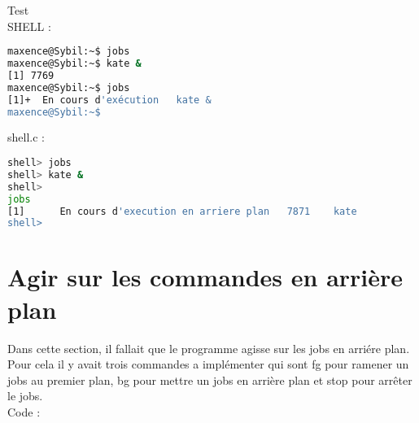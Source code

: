 \documentclass{report}
\begin{document}
			Test \\
			SHELL : 
			\begin{lstlisting}[frame=single,basicstyle=\footnotesize,language=bash]
maxence@Sybil:~$ jobs
maxence@Sybil:~$ kate &
[1] 7769
maxence@Sybil:~$ jobs
[1]+  En cours d'exécution   kate &
maxence@Sybil:~$ 
			\end{lstlisting}
			shell.c :
			\begin{lstlisting}[frame=single,basicstyle=\footnotesize,language=bash]
shell> jobs
shell> kate &
shell>
jobs
[1] 	 En cours d'execution en arriere plan 	7871 	kate
shell> 
			\end{lstlisting}
		\section{Agir sur les commandes en arri\`ere plan}
		Dans cette section, il fallait que le programme agisse sur les jobs en arri\'ere plan. Pour cela il y avait trois commandes a impl\'ementer qui sont fg pour ramener un jobs au premier plan, bg pour mettre un jobs en arri\`ere plan et stop pour arr\^eter le jobs.\\Code : 
\end{document}
